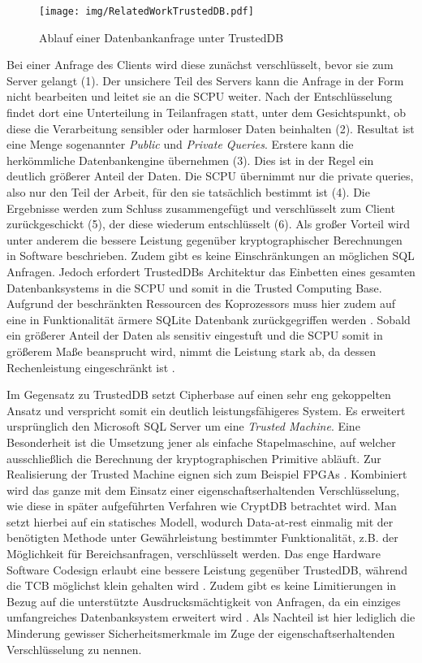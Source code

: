 \begin{figure}[h]
	\texttt{[image: img/RelatedWorkTrustedDB.pdf]}
	\centering
	\caption{Ablauf einer Datenbankanfrage unter TrustedDB}
	\label{fig:trusteddb}
\end{figure}

Bei einer Anfrage des Clients wird diese zunächst verschlüsselt, bevor sie zum Server gelangt (1). Der unsichere Teil des Servers kann die Anfrage in der Form nicht bearbeiten und leitet sie an die SCPU weiter. Nach der Entschlüsselung findet dort eine Unterteilung in Teilanfragen statt, unter dem Gesichtspunkt, ob diese die Verarbeitung sensibler oder harmloser Daten beinhalten (2). Resultat ist eine Menge sogenannter \textit{Public} und \textit{Private Queries}. Erstere kann die herkömmliche Datenbankengine übernehmen (3). Dies ist in der Regel ein deutlich größerer Anteil der Daten. Die SCPU übernimmt nur die private queries, also nur den Teil der Arbeit, für den sie tatsächlich bestimmt ist (4). Die Ergebnisse werden zum Schluss zusammengefügt und verschlüsselt zum Client zurückgeschickt (5), der diese wiederum entschlüsselt (6). Als großer Vorteil wird unter anderem die bessere Leistung gegenüber kryptographischer Berechnungen in Software beschrieben. Zudem gibt es keine Einschränkungen an möglichen \ac{SQL} Anfragen. Jedoch erfordert TrustedDBs Architektur das Einbetten eines gesamten Datenbanksystems in die SCPU und somit in die Trusted Computing Base. Aufgrund der beschränkten Ressourcen des Koprozessors muss hier zudem auf eine in Funktionalität ärmere SQLite Datenbank zurückgegriffen werden \cite{Arasu}. Sobald ein größerer Anteil der Daten als sensitiv eingestuft und die SCPU somit in größerem Maße beansprucht wird, nimmt die Leistung stark ab, da dessen Rechenleistung eingeschränkt ist \cite{Arasu2012}.

Im Gegensatz zu TrustedDB setzt Cipherbase \cite{Arasu2012}\cite{Arasu} auf einen sehr eng gekoppelten Ansatz und verspricht somit ein deutlich leistungsfähigeres System. Es erweitert ursprünglich den Microsoft \ac{SQL} Server um eine \textit{Trusted Machine}. Eine Besonderheit ist die Umsetzung jener als einfache Stapelmaschine, auf welcher ausschließlich die Berechnung der kryptographischen Primitive abläuft. Zur Realisierung der Trusted Machine eignen sich zum Beispiel \acsp{FPGA} \cite{Arasu}. Kombiniert wird das ganze mit dem Einsatz einer eigenschaftserhaltenden Verschlüsselung, wie diese in später aufgeführten Verfahren wie CryptDB betrachtet wird. Man setzt hierbei auf ein statisches Modell, wodurch Data-at-rest einmalig mit der benötigten Methode unter Gewährleistung bestimmter Funktionalität, z.B. der Möglichkeit für Bereichsanfragen, verschlüsselt werden. Das enge Hardware Software Codesign erlaubt eine bessere Leistung gegenüber TrustedDB, während die \ac{TCB} möglichst klein gehalten wird \cite{Arasu}. Zudem gibt es keine Limitierungen in Bezug auf die unterstützte Ausdrucksmächtigkeit von Anfragen, da ein einziges umfangreiches Datenbanksystem erweitert wird \cite{Arasu2013}. Als Nachteil ist hier lediglich die Minderung gewisser Sicherheitsmerkmale im Zuge der eigenschaftserhaltenden Verschlüsselung zu nennen.

